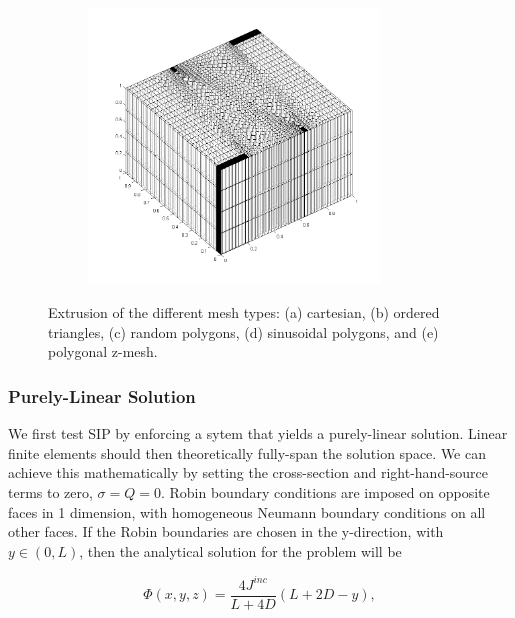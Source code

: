 \begin{figure}
\begin{subfigure}[b]{0.45\textwidth}
		\includegraphics[width=0.85\textwidth]{figures/sec_DSA/SIP_z_poly_extruded_mesh.png}
		\caption{}
	\end{subfigure}
\caption{Extrusion of the different mesh types: (a) cartesian, (b) ordered triangles, (c) random polygons, (d) sinusoidal polygons, and (e) polygonal z-mesh.}
\label{fig::SIP_mesh_extruded}
\end{figure}

\subsubsection{Purely-Linear Solution}
\label{sec::DSA_Results_SIP_Linear}

We first test SIP by enforcing a sytem that yields a purely-linear solution. Linear finite elements should then theoretically fully-span the solution space. We can achieve this mathematically by setting the cross-section and right-hand-source terms to zero, $\sigma = Q = 0$. Robin boundary conditions are imposed on opposite faces in 1 dimension, with homogeneous Neumann boundary conditions on all other faces. If the Robin boundaries are chosen in the y-direction, with $y \in (0,L)$, then the analytical solution for the problem will be 

\begin{equation}
\label{eq::mms_lin_solution}
\Phi(x,y,z) = \frac{4 J^{inc}}{L + 4D} \left(  L + 2 D - y \right),
\end{equation}

